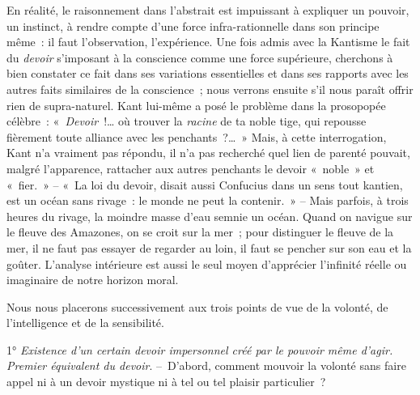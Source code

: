 \documentclass[french,twoside]{book} %
\begin{document}
En réalité, le raisonnement dans l’abstrait est impuissant à expliquer un pouvoir, un instinct, à rendre compte d’une force infra-rationnelle dans son principe même : il faut l’observation, l’expérience. Une fois admis avec la Kantisme le fait du \emph{devoir} s’imposant à la conscience comme une force supérieure, cherchons à bien constater ce fait dans ses variations essentielles et dans ses rapports avec les autres faits similaires de la conscience ; nous verrons ensuite s’il nous paraît offrir rien de supra-naturel. Kant lui-même a posé le problème dans la prosopopée célèbre : « \emph{Devoir} !… où trouver la \emph{racine} de ta noble tige, qui repousse fièrement toute alliance avec les penchants ?… » Mais, à cette interrogation, Kant n’a vraiment pas répondu, il n’a pas recherché quel lien de parenté pouvait, malgré l’apparence, rattacher aux autres penchants le devoir « noble » et « fier. » – « La loi du devoir, disait aussi Confucius dans un sens tout kantien, est un océan sans rivage : le monde ne peut la contenir. » – Mais parfois, à trois heures du rivage, la moindre masse d’eau semnie un océan. Quand on navigue sur le fleuve des Amazones, on se croit sur la mer ; pour distinguer le fleuve de la mer, il ne faut pas essayer de regarder au loin, il faut se pencher sur son eau et la goûter. L’analyse intérieure est aussi le seul moyen d’apprécier l’infinité réelle ou imaginaire de notre horizon moral.\par
Nous nous placerons successivement aux trois points de vue de la volonté, de l’intelligence et de la sensibilité.\par
1° \emph{Existence d’un certain devoir impersonnel créé par le pouvoir même d’agir. Premier équivalent du devoir}. – D’abord, comment mouvoir la volonté sans faire appel ni à un devoir mystique ni à tel ou tel plaisir particulier ?\par
\end{document}
